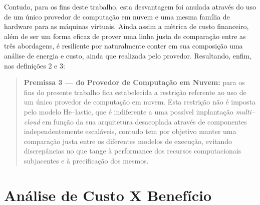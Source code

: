 \documentclass[english,brazilian]{UNISINOSmonografia} %
\begin{document}
Contudo, para os fins deste trabalho, esta desvantagem foi anulada através do uso de um único provedor de computação em nuvem %
e uma mesma família de hardware para as máquinas virtuais.
Ainda assim a métrica de custo financeiro, além de ser um forma eficaz de prover uma linha justa de comparação entre as três abordagens, é resiliente por naturalmente conter em sua composição uma análise de energia e custo, ainda que realizada pelo provedor.
Resultando, enfim, nas definições 2 e 3:
\begin{quote}
	\textbf{Premissa 3 --- do Provedor de Computação em Nuvem:} para os fins do presente trabalho fica estabelecida a restrição referente ao uso de um único provedor de computação em nuvem. Esta restrição não é imposta pelo modelo \textsf{He}--lastic, que é indiferente a uma possível implantação \textit{multi--cloud} em função da sua arquitetura desacoplada através de componentes independentemente escaláveis, contudo tem por objetivo manter uma comparação justa entre os diferentes modelos de execução, evitando discrepâncias no que tange à performance dos recursos computacionais subjacentes e à precificação dos mesmos.
\end{quote}



\section{Análise de Custo X Benefício}
\label{sec:modelo-custben}

\end{document}
